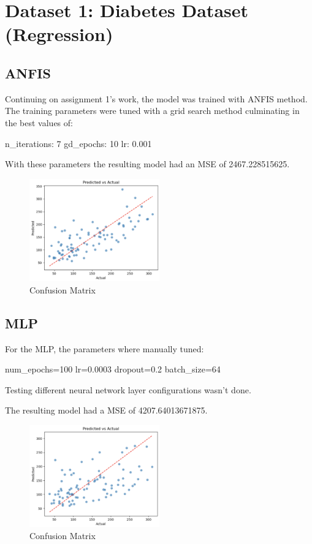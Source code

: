 \section{Dataset 1: Diabetes Dataset (Regression)}

\subsection{ANFIS}

Continuing on assignment 1's work, the model was trained with ANFIS method. The training parameters were tuned with a grid search method culminating in the best values of:

n\_iterations: 7
gd\_epochs: 10
lr: 0.001

With these parameters the resulting model had an MSE of 2467.228515625.

\begin{figure}[h!]
    \centering
    \includegraphics[width=0.5\textwidth]{Plots/PredictedActualANFIS.png}
    \caption{Confusion Matrix}
    \label{fig:my_label}
\end{figure}

\subsection{MLP}

For the MLP, the parameters where manually tuned:

num\_epochs=100
lr=0.0003
dropout=0.2
batch\_size=64

Testing different neural network layer configurations wasn't done.

The resulting model had a MSE of 4207.64013671875.

\begin{figure}[h!]
    \centering
    \includegraphics[width=0.5\textwidth]{Plots/PredictedActualMLP.png}
    \caption{Confusion Matrix}
    \label{fig:my_label}
\end{figure}


